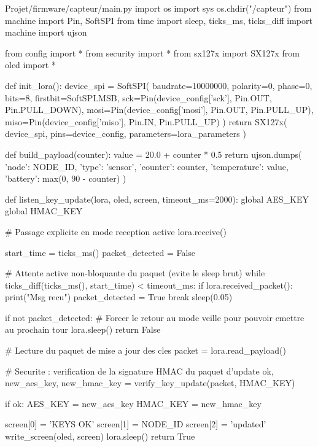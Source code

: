 \documentclass[a4paper,11pt]{report}
\begin{document}
\begin{pycode}{Projet/firmware/capteur/main.py}
import os
import sys
os.chdir("/capteur")
from machine import Pin, SoftSPI
from time import sleep, ticks_ms, ticks_diff
import machine
import ujson

from config import *
from security import *
from sx127x import SX127x
from oled import *


def init_lora():
    device_spi = SoftSPI(
        baudrate=10000000,
        polarity=0,
        phase=0,
        bits=8,
        firstbit=SoftSPI.MSB,
        sck=Pin(device_config['sck'], Pin.OUT, Pin.PULL_DOWN),
        mosi=Pin(device_config['mosi'], Pin.OUT, Pin.PULL_UP),
        miso=Pin(device_config['miso'], Pin.IN, Pin.PULL_UP)
    )
    return SX127x(
        device_spi,
        pins=device_config,
        parameters=lora_parameters
    )


def build_payload(counter):
    value = 20.0 + counter * 0.5
    return ujson.dumps({
        'node': NODE_ID,
        'type': 'sensor',
        'counter': counter,
        'temperature': value,
        'battery': max(0, 90 - counter)
    })


def listen_key_update(lora, oled, screen, timeout_ms=2000):
    global AES_KEY
    global HMAC_KEY

    # Passage explicite en mode reception active
    lora.receive()

    start_time = ticks_ms()
    packet_detected = False

    # Attente active non-bloquante du paquet (evite le sleep brut)
    while ticks_diff(ticks_ms(), start_time) < timeout_ms:
        if lora.received_packet():
            print("Msg recu")
            packet_detected = True
            break
        sleep(0.05)

    if not packet_detected:
        # Forcer le retour au mode veille pour pouvoir emettre au prochain tour
        lora.sleep()
        return False

    # Lecture du paquet de mise a jour des cles
    packet = lora.read_payload()

    # Securite : verification de la signature HMAC du paquet d'update
    ok, new_aes_key, new_hmac_key = verify_key_update(packet, HMAC_KEY)

    if ok:
        AES_KEY = new_aes_key
        HMAC_KEY = new_hmac_key

        screen[0] = 'KEYS OK'
        screen[1] = NODE_ID
        screen[2] = 'updated'
        write_screen(oled, screen)
        lora.sleep()
        return True


\end{pycode}
\end{document}
